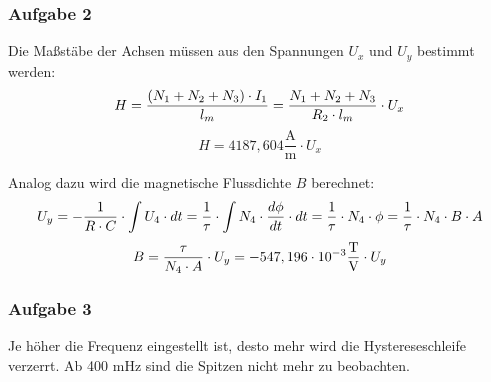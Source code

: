 \documentclass[a4paper,twoside,12pt,DIV=13,BCOR=5mm,numbers=noenddot,cleardoublepage=empty]{scrbook}
\begin{document}
  
            \subsubsection{Aufgabe 2}
                Die Maßstäbe der Achsen müssen aus den Spannungen $U_x$ und $U_y$ bestimmt werden:
                \begin{equation}
                    H = \frac{(N_1 + N_2 + N_3) \cdot I_1}{l_m} \\
                    = \frac{N_1 + N_2 + N_3}{R_2 \cdot l_m} \cdot U_x \\
                \end{equation}
                \begin{equation}
                    H = 4187,604 \frac{\text{A}}{\text{m}} \cdot U_x
                \end{equation}

                Analog dazu wird die magnetische Flussdichte $B$ berechnet:
                \begin{equation}
                    U_y = -\frac{1}{R \cdot C} \cdot \int U_4 \cdot dt \\
                    = \frac{1}{\tau} \cdot \int N_4 \cdot \frac{d\phi}{dt} \cdot dt \\
                    = \frac{1}{\tau} \cdot N_4 \cdot \phi \\
                    = \frac{1}{\tau} \cdot N_4 \cdot B \cdot A \\
                \end{equation}
                \begin{equation}
                    B = \frac{\tau}{N_4 \cdot A} \cdot U_y \\
                    = -547,196 \cdot 10^{-3} \frac{\text{T}}{\text{V}} \cdot U_y
                \end{equation}

            

            \newpage

            \subsubsection{Aufgabe 3} Je höher die Frequenz eingestellt ist, desto mehr wird die Hystereseschleife verzerrt. Ab 400 mHz sind die Spitzen nicht mehr zu beobachten.
\end{document}
